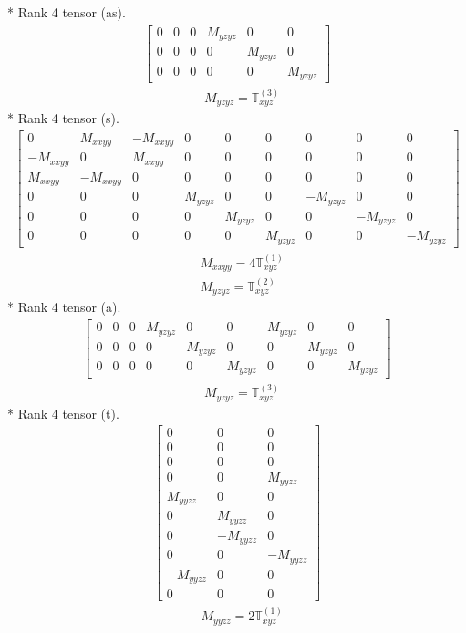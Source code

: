 \documentclass[fleqn,8pt,landscape]{jsarticle}
\begin{document}
* Rank 4 tensor (as).
\begin{align*}
\begin{bmatrix} 0 & 0 & 0 & M_{yzyz} & 0 & 0 \\ 0 & 0 & 0 & 0 & M_{yzyz} & 0 \\ 0 & 0 & 0 & 0 & 0 & M_{yzyz} \end{bmatrix}
\end{align*}
\begin{align*}
& M_{yzyz} = \mathbb{T}_{xyz}^{(3)}
\end{align*}
* Rank 4 tensor (s).
\begin{align*}
\begin{bmatrix} 0 & M_{xxyy} & - M_{xxyy} & 0 & 0 & 0 & 0 & 0 & 0 \\ - M_{xxyy} & 0 & M_{xxyy} & 0 & 0 & 0 & 0 & 0 & 0 \\ M_{xxyy} & - M_{xxyy} & 0 & 0 & 0 & 0 & 0 & 0 & 0 \\ 0 & 0 & 0 & M_{yzyz} & 0 & 0 & - M_{yzyz} & 0 & 0 \\ 0 & 0 & 0 & 0 & M_{yzyz} & 0 & 0 & - M_{yzyz} & 0 \\ 0 & 0 & 0 & 0 & 0 & M_{yzyz} & 0 & 0 & - M_{yzyz} \end{bmatrix}
\end{align*}
\begin{align*}
& M_{xxyy} = 4 \mathbb{T}_{xyz}^{(1)} \\
& M_{yzyz} = \mathbb{T}_{xyz}^{(2)}
\end{align*}
* Rank 4 tensor (a).
\begin{align*}
\begin{bmatrix} 0 & 0 & 0 & M_{yzyz} & 0 & 0 & M_{yzyz} & 0 & 0 \\ 0 & 0 & 0 & 0 & M_{yzyz} & 0 & 0 & M_{yzyz} & 0 \\ 0 & 0 & 0 & 0 & 0 & M_{yzyz} & 0 & 0 & M_{yzyz} \end{bmatrix}
\end{align*}
\begin{align*}
& M_{yzyz} = \mathbb{T}_{xyz}^{(3)}
\end{align*}
* Rank 4 tensor (t).
\begin{align*}
\begin{bmatrix} 0 & 0 & 0 \\ 0 & 0 & 0 \\ 0 & 0 & 0 \\ 0 & 0 & M_{yyzz} \\ M_{yyzz} & 0 & 0 \\ 0 & M_{yyzz} & 0 \\ 0 & - M_{yyzz} & 0 \\ 0 & 0 & - M_{yyzz} \\ - M_{yyzz} & 0 & 0 \\ 0 & 0 & 0 \end{bmatrix}
\end{align*}
\begin{align*}
& M_{yyzz} = 2 \mathbb{T}_{xyz}^{(1)}
\end{align*}
\end{document}
